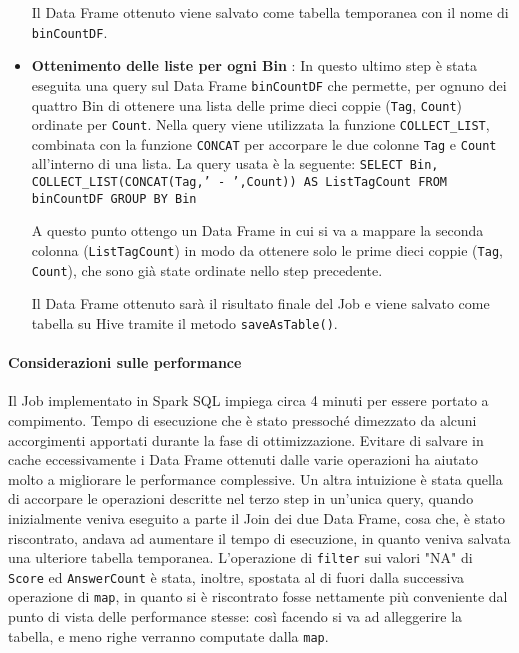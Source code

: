 \begin{itemize}
    Il Data Frame ottenuto viene salvato come tabella temporanea con il nome di \texttt{binCountDF}.
    \item \textbf{Ottenimento delle liste per ogni Bin} : In questo ultimo step è stata eseguita una query sul Data Frame
    \texttt{binCountDF} che permette, per ognuno dei quattro Bin di ottenere una lista delle prime dieci coppie
    (\texttt{Tag}, \texttt{Count}) ordinate per \texttt{Count}.
    Nella query viene utilizzata la funzione \texttt{COLLECT_LIST}, combinata con la funzione \texttt{CONCAT} per accorpare
    le due colonne \texttt{Tag} e \texttt{Count} all'interno di una lista.
    La query usata è la seguente:
    \texttt{SELECT Bin, COLLECT_LIST(CONCAT(Tag,' - ',Count)) AS ListTagCount FROM binCountDF GROUP BY Bin}

    A questo punto ottengo un Data Frame in cui si va a mappare la seconda colonna (\texttt{ListTagCount}) in modo da ottenere
    solo le prime dieci coppie (\texttt{Tag}, \texttt{Count}), che sono già state ordinate nello step precedente.

    Il Data Frame ottenuto sarà il risultato finale del Job e viene salvato come tabella su Hive tramite il metodo
    \texttt{saveAsTable()}.
  \end{itemize}


  \paragraph{Considerazioni sulle performance}\label{par:job2:spark:performance}

  Il Job implementato in Spark SQL impiega circa 4 minuti per essere portato a compimento.
  Tempo di esecuzione che è stato pressoché dimezzato da alcuni accorgimenti apportati durante la fase di ottimizzazione.
  Evitare di salvare in cache eccessivamente i Data Frame ottenuti dalle varie operazioni ha aiutato molto a migliorare
  le performance complessive.
  Un altra intuizione è stata quella di accorpare le operazioni descritte nel terzo step in un'unica query, quando inizialmente
  veniva eseguito a parte il Join dei due Data Frame, cosa che, è stato riscontrato, andava ad aumentare il tempo di esecuzione,
  in quanto veniva salvata una ulteriore tabella temporanea.
  L'operazione di \texttt{filter} sui valori "NA" di \texttt{Score} ed \texttt{AnswerCount} è stata, inoltre, spostata al di fuori
  dalla successiva operazione di \texttt{map}, in quanto si è riscontrato fosse nettamente più conveniente dal punto di vista
  delle performance stesse: così facendo si va ad alleggerire la tabella, e meno righe verranno computate dalla \texttt{map}.

